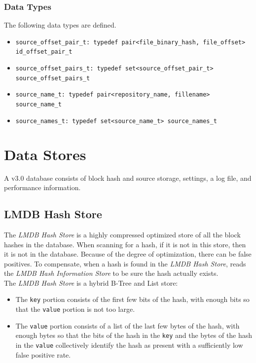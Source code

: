 \documentclass[11pt,fleqn]{article} %
\begin{document}
\subsubsection{Data Types}

The following data types are defined.

\begin{itemize}
\item \verb+source_offset_pair_t: typedef pair<file_binary_hash, file_offset> id_offset_pair_t+
\item \verb+source_offset_pairs_t: typedef set<source_offset_pair_t> source_offset_pairs_t+
\item \verb+source_name_t: typedef pair<repository_name, fillename> source_name_t+
\item \verb+source_names_t: typedef set<source_name_t> source_names_t+
\end{itemize}

\section{\hdb Data Stores}
A \hdb v3.0 database consists of block hash and source storage, settings, a log file, and performance information.

\subsection{LMDB Hash Store}
The \textit{LMDB Hash Store} is a highly compressed optimized store of all the block hashes in the database.  When scanning for a hash, if it is not in this store, then it is not in the database.  Because of the degree of optimization, there can be false positives.  To compensate, when a hash is found in the \textit{LMDB Hash Store}, \hdb reads the \textit{LMDB Hash Information Store} to be sure the hash actually exists.\\

The \textit{LMDB Hash Store} is a hybrid B-Tree and List store:
\begin{itemize}
\item The \verb+key+ portion consists of the first few bits of the hash, with enough bits so that the \verb+value+ portion is not too large.
\item The \verb+value+ portion consists of a list of the last few bytes of the hash, with enough bytes so that the bits of the hash in the \verb+key+ and the bytes of the hash in the \verb+value+ collectively identify the hash as present with a sufficiently low false positive rate.
\end{itemize}
\end{document}
